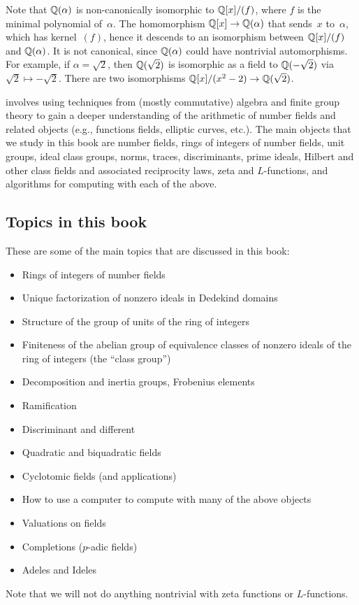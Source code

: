 Note that
$\mathbb{Q}(\alpha)$ is non-canonically isomorphic to $\mathbb{Q}[x]/(f)$, where $f$
is the minimal polynomial of~$\alpha$.
The homomorphism $\mathbb{Q}[x]\to\mathbb{Q}(\alpha)$ that sends~$x$ to~$\alpha$,
which has kernel~$(f)$, hence it descends to an isomorphism between
$\mathbb{Q}[x]/(f)$ and $\mathbb{Q}(\alpha)$.
It is not canonical, since $\mathbb{Q}(\alpha)$ could
have nontrivial automorphisms.  For example, if $\alpha=\sqrt{2}$, then
$\mathbb{Q}(\sqrt{2})$ is isomorphic as a field to $\mathbb{Q}(-\sqrt{2})$ via
$\sqrt{2}\mapsto -\sqrt{2}$.  There are two isomorphisms
$\mathbb{Q}[x]/(x^2-2)\to \mathbb{Q}(\sqrt{2})$.

 involves using techniques from (mostly
commutative) algebra and finite group theory to gain a deeper
understanding of the arithmetic of number fields and related objects
(e.g., functions fields, elliptic curves, etc.).  The main objects that we
study in this book are number fields, rings of integers
of number fields, unit groups, ideal class groups, norms, traces,
discriminants, prime ideals, Hilbert and other class fields and
associated reciprocity laws, zeta and $L$-functions, and algorithms
for computing with each of the above.

\subsection{Topics in this book}
These are some of the main topics that are discussed in this book:
\begin{itemize}\setlength{\itemsep}{-.7ex}
\item Rings of integers of number fields
\item Unique factorization of nonzero ideals in Dedekind domains
\item Structure of the group of units of the ring of integers
\item Finiteness of the abelian group of equivalence classes
of nonzero ideals of the ring of integers (the ``class group'')
\item Decomposition and inertia groups, Frobenius elements
\item Ramification
\item Discriminant and different
\item Quadratic and biquadratic fields
\item Cyclotomic fields (and applications)
\item How to use a computer to compute with many of the above objects
\item Valuations on fields
\item Completions ($p$-adic fields)
\item Adeles and Ideles
\end{itemize}
Note that we will not do anything nontrivial with zeta functions or
$L$-functions. 



